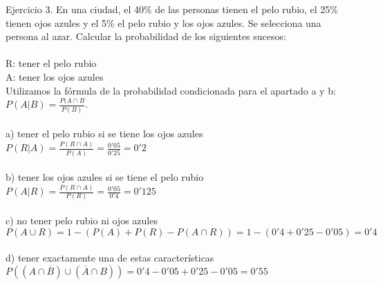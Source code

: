 \problem
Ejercicio 3. En una ciudad, el 40\% de las personas tienen el pelo rubio, el 25\% tienen ojos azules y el 5\% el pelo rubio y los ojos azules. Se selecciona una persona al azar. Calcular la probabilidad de los siguientes sucesos: \\ \\
R: tener el pelo rubio \\
A: tener los ojos azules \\
Utilizamos la fórmula de la probabilidad condicionada para el apartado a y b: $P(A|B) = \frac{P(A\cap B}{P(B)}$. \\ \\
a) tener el pelo rubio si se tiene los ojos azules \\
$P(R|A) = \frac{P(R \cap A)}{P(A)} = \frac{0'05}{0'25} = 0'2$ \\ \\
b) tener los ojos azules si se tiene el pelo rubio \\
$P(A|R) = \frac{P(R \cap A)}{P(R)} = \frac{0'05}{0'4} = 0'125$ \\ \\
c) no tener pelo rubio ni ojos azules \\ 
$P(A \cup R) = 1 - (P(A)+P(R)-P(A\cap R)) = 1 - (0'4+0'25-0'05) = 0'4 $ \\ \\
d) tener exactamente una de estas características \\
$P((A\cap \overline{B}) \cup (\overline{A} \cap B)) = 0'4 - 0'05 + 0'25 - 0'05 = 0'55 $ 